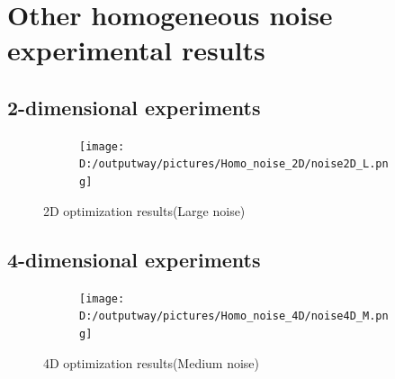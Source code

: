 \documentclass{article}
\begin{document}
\section{Other homogeneous noise experimental results}
\subsection{2-dimensional experiments}
\begin{figure}[H]
    \centering
    \begin{subfigure}[t]{.74\linewidth}
        \centering
        \texttt{[image: D:/outputway/pictures/Homo\_noise\_2D/noise2D\_L.png]}
    \end{subfigure}
    \caption{2D optimization results(Large noise)}
    \label{Fig7}
\end{figure}

\subsection{4-dimensional experiments}

\begin{figure}[H]
    \centering
    \begin{subfigure}[t]{.74\linewidth}
        \centering
        \texttt{[image: D:/outputway/pictures/Homo\_noise\_4D/noise4D\_M.png]}
    \end{subfigure}
    \caption{4D optimization results(Medium noise)}
    \label{Fig8}
\end{figure}
\end{document}
